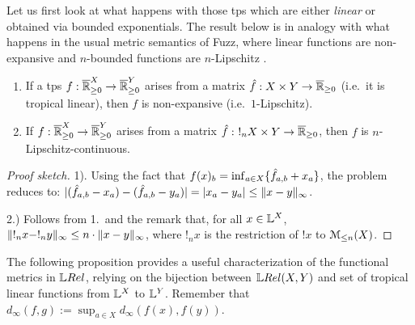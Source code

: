 Let us first look at what happens with those tps which are either \emph{linear} or obtained via bounded exponentials.
The result below is in analogy with what happens in the usual metric semantics of Fuzz, where 
linear functions are non-expansive and $n$-bounded functions are $n$-Lipschitz \cite{Reed2010}.


\begin{proposition}\label{prop:troplinear}
\begin{enumerate}
\item If a tps $f: \overline{\mathbb{R}}_{\geq 0}^{X}\to \overline{\mathbb{R}}_{\geq 0}^{Y}$ arises from a matrix $\hat{f}:X\times Y\to \overline{\mathbb{R}}_{\geq 0}$ (i.e.~it is tropical linear), then $f$ is non-expansive (i.e.\ $1$-Lipschitz).  
\item If  $f: \overline{\mathbb{R}}_{\geq 0}^{X}\to \overline{\mathbb{R}}_{\geq 0}^{Y}$ arises from a matrix $\hat{f}: \ !_{n}X\times Y\to \overline{\mathbb{R}}_{\geq 0}$, then $f$ is $n$-Lipschitz-continuous.
\end{enumerate}
\end{proposition}
\begin{proof}[Proof sketch]
1). Using the fact that $f( x)_{b}= \inf_{a\in X}\{\hat{f}_{a,b}+ x_{a}\}$,
the problem reduces to: $|(\hat{f}_{a,b}- x_{a})- (\hat{f}_{a,b}- y_{a})| = |x_{a}- y_{a}|\leq \lVert x- y\rVert_{\infty}$. %

2.) Follows from 1.~and the remark that, for all $x\in \mathbb{L}^{X}$, $\lVert !_{n} x-!_{n} y\rVert_{\infty}\leq n\cdot \lVert x- y\rVert_{\infty}$, where $!_{n} x$ is the restriction of $! x$ to $\mathcal{M}_{\leq n}(X)$.%
\end{proof} 

The following proposition provides a useful characterization of the functional metrics in $\LREL$, relying on 
the bijection between $\HOM{\LREL}{X}{Y}$ and set of tropical linear functions from $\mathbb{L}^{X}$ to $\mathbb{L}^{Y}$.
Remember that $d_\infty(f,g):=\sup_{a\in X} d_\infty(f(x),f(y))$.


